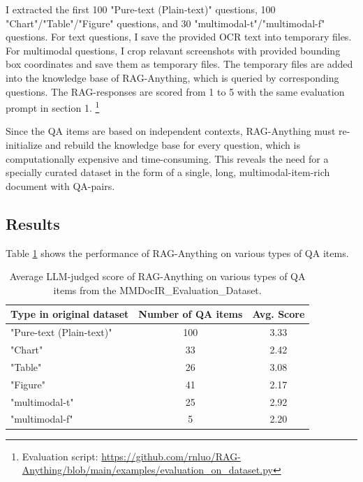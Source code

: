 \documentclass{article}
\begin{document}
  I extracted the first 100 "Pure-text (Plain-text)" questions, 100 "Chart"/"Table"/"Figure" questions, and 30 "multimodal-t"/"multimodal-f" questions.
  For text questions, I save the provided OCR text into temporary files.
  For multimodal questions, I crop relavant screenshots with provided bounding box coordinates and save them as temporary files.
  The temporary files are added into the knowledge base of RAG-Anything, which is queried by corresponding questions.
  The RAG-responses are scored from 1 to 5 with the same evaluation prompt in section 1.
  \footnote{Evaluation script: \url{https://github.com/rnluo/RAG-Anything/blob/main/examples/evaluation_on_dataset.py}}

  Since the QA items are based on independent contexts, RAG-Anything must re-initialize and rebuild the knowledge base for every question, which is computationally expensive and time-consuming.
  This reveals the need for a specially curated dataset in the form of a single, long, multimodal-item-rich document with QA-pairs.

  \subsection{Results}

  Table \ref{tab:results2} shows the performance of RAG-Anything on various types of QA items.

  \begin{table}[ht]
        \centering
        \label{tab:results2}
        \begin{tabular}{l|cc}
        \toprule
          Type in original dataset& Number of QA items & Avg. Score\\
          \midrule
            "Pure-text (Plain-text)" & 100 & 3.33\\
            "Chart" &     33  & 2.42\\
            "Table" &  26 & 3.08\\
            "Figure" &   41 & 2.17\\
            "multimodal-t" &  25 &  2.92 \\
            "multimodal-f" &   5 & 2.20 \\
        \bottomrule
        \end{tabular}
        \vspace{12pt}
        \caption{Average LLM-judged score of RAG-Anything on various types of QA items from the MMDocIR\_Evaluation\_Dataset.}
    \end{table}
\end{document}
